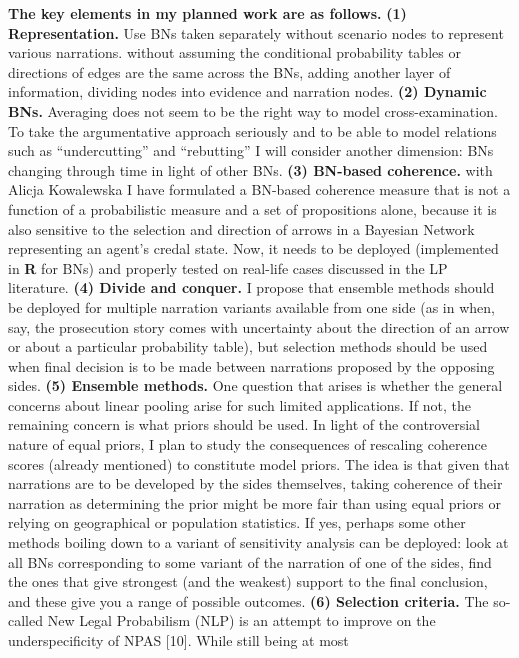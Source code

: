 \documentclass[11pt,dvipsnames,enabledeprecatedfontcommands]{scrartcl}
\begin{document}
\noindent \textbf{The key elements in my planned work are as follows.}
\textbf{(1) Representation.} Use BNs taken separately without scenario
nodes to represent various narrations. without assuming the conditional
probability tables or directions of edges are the same across the BNs,
adding another layer of information, dividing nodes into evidence and
narration nodes. \textbf{(2) Dynamic BNs.} Averaging does not seem to be
the right way to model cross-examination. To take the argumentative
approach seriously and to be able to model relations such as
``undercutting'' and ``rebutting'' I will consider another dimension:
BNs changing through time in light of other BNs.
\textbf{(3) BN-based coherence.} with Alicja Kowalewska I have
formulated a BN-based coherence measure that is not a function of a
probabilistic measure and a set of propositions alone, because it is
also sensitive to the selection and direction of arrows in a Bayesian
Network representing an agent's credal state. Now, it needs to be
deployed (implemented in \textbf{\textsf{R}} for BNs) and properly
tested on real-life cases discussed in the LP literature.
\textbf{(4) Divide and conquer.} I propose that ensemble methods should
be deployed for multiple narration variants available from one side (as
in when, say, the prosecution story comes with uncertainty about the
direction of an arrow or about a particular probability table), but
selection methods should be used when final decision is to be made
between narrations proposed by the opposing sides.
\textbf{(5) Ensemble methods.} One question that arises is whether the
general concerns about linear pooling arise for such limited
applications. If not, the remaining concern is what priors should be
used. In light of the controversial nature of equal priors, I plan to
study the consequences of rescaling coherence scores (already mentioned)
to constitute model priors. The idea is that given that narrations are
to be developed by the sides themselves, taking coherence of their
narration as determining the prior might be more fair than using equal
priors or relying on geographical or population statistics. If yes,
perhaps some other methods boiling down to a variant of sensitivity
analysis can be deployed: look at all BNs corresponding to some variant
of the narration of one of the sides, find the ones that give strongest
(and the weakest) support to the final conclusion, and these give you a
range of possible outcomes. \textbf{(6) Selection criteria.} The
so-called New Legal Probabilism (NLP) is an attempt to improve on the
underspecificity of NPAS {[}10{]}. While still being at most
\end{document}
